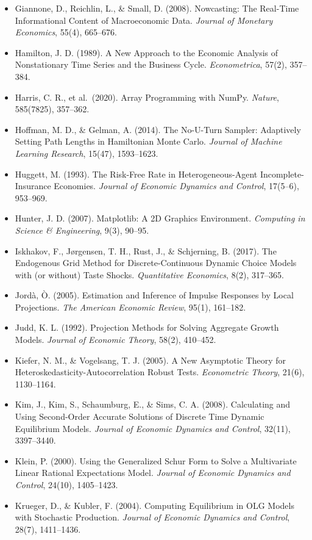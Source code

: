 \documentclass[11pt,letterpaper]{article}
\newcounter{none} %
\renewcommand{\_}{\pmunderscore\allowbreak}
\begin{document}
\begin{itemize}
\item
  Giannone, D., Reichlin, L., \& Small, D. (2008). Nowcasting: The Real-Time Informational Content of Macroeconomic Data. \emph{Journal of Monetary Economics}, 55(4), 665--676.
\item
  Hamilton, J. D. (1989). A New Approach to the Economic Analysis of Nonstationary Time Series and the Business Cycle. \emph{Econometrica}, 57(2), 357--384.
\item
  Harris, C. R., et al.~(2020). Array Programming with NumPy. \emph{Nature}, 585(7825), 357--362.
\item
  Hoffman, M. D., \& Gelman, A. (2014). The No-U-Turn Sampler: Adaptively Setting Path Lengths in Hamiltonian Monte Carlo. \emph{Journal of Machine Learning Research}, 15(47), 1593--1623.
\item
  Huggett, M. (1993). The Risk-Free Rate in Heterogeneous-Agent Incomplete-Insurance Economies. \emph{Journal of Economic Dynamics and Control}, 17(5--6), 953--969.
\item
  Hunter, J. D. (2007). Matplotlib: A 2D Graphics Environment. \emph{Computing in Science \& Engineering}, 9(3), 90--95.
\item
  Iskhakov, F., Jørgensen, T. H., Rust, J., \& Schjerning, B. (2017). The Endogenous Grid Method for Discrete-Continuous Dynamic Choice Models with (or without) Taste Shocks. \emph{Quantitative Economics}, 8(2), 317--365.
\item
  Jordà, Ò. (2005). Estimation and Inference of Impulse Responses by Local Projections. \emph{The American Economic Review}, 95(1), 161--182.
\item
  Judd, K. L. (1992). Projection Methods for Solving Aggregate Growth Models. \emph{Journal of Economic Theory}, 58(2), 410--452.
\item
  Kiefer, N. M., \& Vogelsang, T. J. (2005). A New Asymptotic Theory for Heteroskedasticity-Autocorrelation Robust Tests. \emph{Econometric Theory}, 21(6), 1130--1164.
\item
  Kim, J., Kim, S., Schaumburg, E., \& Sims, C. A. (2008). Calculating and Using Second-Order Accurate Solutions of Discrete Time Dynamic Equilibrium Models. \emph{Journal of Economic Dynamics and Control}, 32(11), 3397--3440.
\item
  Klein, P. (2000). Using the Generalized Schur Form to Solve a Multivariate Linear Rational Expectations Model. \emph{Journal of Economic Dynamics and Control}, 24(10), 1405--1423.
\item
  Krueger, D., \& Kubler, F. (2004). Computing Equilibrium in OLG Models with Stochastic Production. \emph{Journal of Economic Dynamics and Control}, 28(7), 1411--1436.

\end{itemize}
\end{document}
